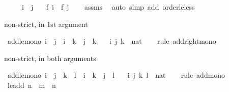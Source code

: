 \begin{isabellebody}
\ \ \ \ \ {\isachardoublequoteopen}i\ {\isasymle}\ j{\isachardoublequoteclose}\isanewline
\ \ \ {\isachardoublequoteopen}f\ i\ {\isasymle}\ f\ j{\isachardoublequoteclose}\isanewline
%
\isadelimproof
\ \ %
\endisadelimproof
%
\isatagproof
{}\isamarkupfalse%
\ assms\ \isamarkupfalse%
\ {\isacharparenleft}{\kern0pt}auto\ simp\ add{\isacharcolon}{\kern0pt}\ order{\isacharunderscore}{\kern0pt}le{\isacharunderscore}{\kern0pt}less{\isacharparenright}{\kern0pt}%
\endisatagproof
{\isafoldproof}%
%
\isadelimproof
%
\endisadelimproof
%
\begin{isamarkuptext}%
non-strict, in 1st argument%
\end{isamarkuptext}\isamarkuptrue%
\isamarkupfalse%
\ add{\isacharunderscore}{\kern0pt}le{\isacharunderscore}{\kern0pt}mono{}{\isacharcolon}{\kern0pt}\ {\isachardoublequoteopen}i\ {\isasymle}\ j\ {\isasymLongrightarrow}\ i\ {\isacharplus}{\kern0pt}\ k\ {\isasymle}\ j\ {\isacharplus}{\kern0pt}\ k{\isachardoublequoteclose}\isanewline
\ \ \ i\ j\ k\ {\isacharcolon}{\kern0pt}{\isacharcolon}{\kern0pt}\ nat\isanewline
%
\isadelimproof
\ \ %
\endisadelimproof
%
\isatagproof
{}\isamarkupfalse%
\ {\isacharparenleft}{\kern0pt}rule\ add{\isacharunderscore}{\kern0pt}right{\isacharunderscore}{\kern0pt}mono{\isacharparenright}{\kern0pt}%
\endisatagproof
{\isafoldproof}%
%
\isadelimproof
%
\endisadelimproof
%
\begin{isamarkuptext}%
non-strict, in both arguments%
\end{isamarkuptext}\isamarkuptrue%
\isamarkupfalse%
\ add{\isacharunderscore}{\kern0pt}le{\isacharunderscore}{\kern0pt}mono{\isacharcolon}{\kern0pt}\ {\isachardoublequoteopen}i\ {\isasymle}\ j\ {\isasymLongrightarrow}\ k\ {\isasymle}\ l\ {\isasymLongrightarrow}\ i\ {\isacharplus}{\kern0pt}\ k\ {\isasymle}\ j\ {\isacharplus}{\kern0pt}\ l{\isachardoublequoteclose}\isanewline
\ \ \ i\ j\ k\ l\ {\isacharcolon}{\kern0pt}{\isacharcolon}{\kern0pt}\ nat\isanewline
%
\isadelimproof
\ \ %
\endisadelimproof
%
\isatagproof
{}\isamarkupfalse%
\ {\isacharparenleft}{\kern0pt}rule\ add{\isacharunderscore}{\kern0pt}mono{\isacharparenright}{\kern0pt}%
\endisatagproof
{\isafoldproof}%
%
\isadelimproof
\isanewline
%
\endisadelimproof
\isanewline
{}\isamarkupfalse%
\ le{\isacharunderscore}{\kern0pt}add{}{\isacharcolon}{\kern0pt}\ {\isachardoublequoteopen}n\ {\isasymle}\ m\ {\isacharplus}{\kern0pt}\ n{\isachardoublequoteclose}\isanewline

\end{isabellebody}
